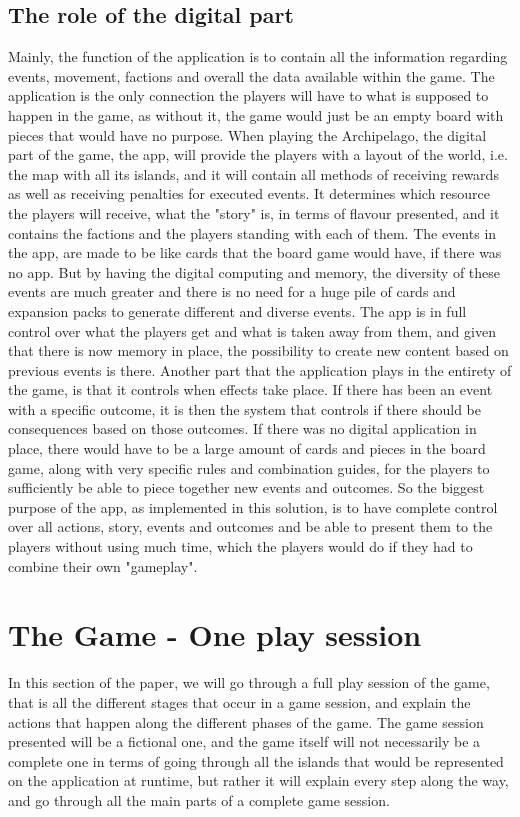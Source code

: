 \subsection{The role of the digital part}
Mainly, the function of the application is to contain all the information regarding events, movement, factions and overall the data available within the game. The application is the only connection the players will have to what is supposed to happen in the game, as without it, the game would just be an empty board with pieces that would have no purpose. 
When playing the Archipelago, the digital part of the game, the app, will provide the players with a layout of the world, i.e. the map with all its islands, and it will contain all methods of receiving rewards as well as receiving penalties for executed events. It determines which resource the players will receive, what the "story" is, in terms of flavour presented, and it contains the factions and the players standing with each of them.
The events in the app, are made to be like cards that the board game would have, if there was no app. But by having the digital computing and memory, the diversity of these events are much greater and there is no need for a huge pile of cards and expansion packs to generate different and diverse events. The app is in full control over what the players get and what is taken away from them, and given that there is now memory in place, the possibility to create new content based on previous events is there. Another part that the application plays in the entirety of the game, is that it controls when effects take place. If there has been an event with a specific outcome, it is then the system that controls if there should be consequences based on those outcomes. If there was no digital application in place, there would have to be a large amount of cards and pieces in the board game, along with very specific rules and combination guides, for the players to sufficiently be able to piece together new events and outcomes. So the biggest purpose of the app, as implemented in this solution, is to have complete control over all actions, story, events and outcomes and be able to present them to the players without using much time, which the players would do if they had to combine their own "gameplay".

\section{The Game - One play session}
In this section of the paper, we will go through a full play session of the game, that is all the different stages that occur in a game session, and explain the actions that happen along the different phases of the game.
The game session presented will be a fictional one, and the game itself will not necessarily be a complete one in terms of going through all the islands that would be represented on the application at runtime, but rather it will explain every step along the way, and go through all the main parts of a complete game session.

